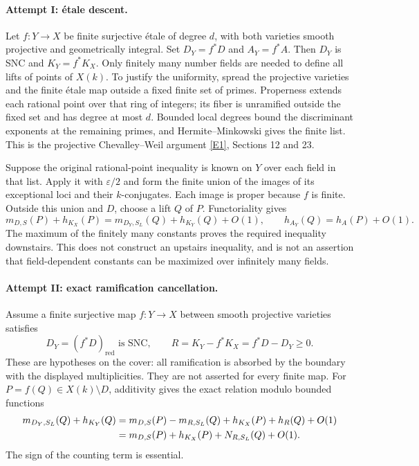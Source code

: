 \documentclass[11pt,a4paper]{article}
\newcommand{\eps}{\varepsilon}
\newcommand{\eref}[2]{\hyperlink{extra:#1:#2}{[E#2]}}
\numberwithin{equation}{section}
\begin{document}
\paragraph{Attempt I: étale descent.}
Let $f:Y\to X$ be finite surjective étale of degree $d$, with both varieties smooth projective and geometrically integral. Set $D_Y=f^*D$ and $A_Y=f^*A$. Then $D_Y$ is SNC and $K_Y=f^*K_X$. Only finitely many number fields are needed to define all lifts of points of $X(k)$. To justify the uniformity, spread the projective varieties and the finite étale map outside a fixed finite set of primes. Properness extends each rational point over that ring of integers; its fiber is unramified outside the fixed set and has degree at most $d$. Bounded local degrees bound the discriminant exponents at the remaining primes, and Hermite--Minkowski gives the finite list. This is the projective Chevalley--Weil argument \eref{30005098}{1}, Sections 12 and 23.

Suppose the original rational-point inequality is known on $Y$ over each field in that list. Apply it with $\eps/2$ and form the finite union of the images of its exceptional loci and their $k$-conjugates. Each image is proper because $f$ is finite. Outside this union and $D$, choose a lift $Q$ of $P$. Functoriality gives
\[
 m_{D,S}(P)+h_{K_X}(P)
 =m_{D_Y,S_L}(Q)+h_{K_Y}(Q)+O(1),\qquad
 h_{A_Y}(Q)=h_A(P)+O(1).
\]
The maximum of the finitely many constants proves the required inequality downstairs. This does not construct an upstairs inequality, and is not an assertion that field-dependent constants can be maximized over infinitely many fields.

\paragraph{Attempt II: exact ramification cancellation.}
Assume a finite surjective map $f:Y\to X$ between smooth projective varieties satisfies
\begin{equation}\label{r64:cover}
 D_Y=(f^*D)_{\mathrm{red}}\text{ is SNC},\qquad
 R=K_Y-f^*K_X=f^*D-D_Y\ge0.
\end{equation}
These are hypotheses on the cover: all ramification is absorbed by the boundary with the displayed multiplicities. They are not asserted for every finite map. For $P=f(Q)\in X(k)\setminus D$, additivity gives the exact relation modulo bounded functions
\begin{align}
 m_{D_Y,S_L}(Q)+h_{K_Y}(Q)
 &=m_{D,S}(P)-m_{R,S_L}(Q)+h_{K_X}(P)+h_R(Q)+O(1)\notag\\
 &=m_{D,S}(P)+h_{K_X}(P)+N_{R,S_L}(Q)+O(1).
 \label{r64:identity}
\end{align}
The sign of the counting term is essential.
\end{document}
